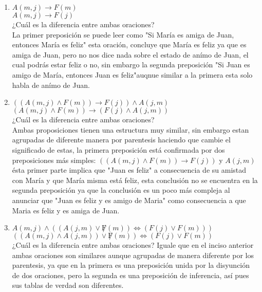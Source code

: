 \documentclass[a4paper,10pt]{article}
\begin{document}
\begin{enumerate}[label=(\alph*)]
 \item \(A(m,j) \to F(m)\)\\
       \(A(m,j) \to F(j)\)\\
       ¿Cuál es la diferencia entre ambas oraciones?\\
       La primer preposición se puede leer como "Si María es amiga de Juan, entonces María es feliz" esta oración, concluye que María es feliz ya que es amiga de Juan, pero no nos dice nada sobre el estado de anímo de Juan, el cual podrás estar feliz o no, sin embargo la segunda preposición "Si Juan es amigo de María, entonces Juan es feliz"auqnue similar a la primera esta solo habla de anímo de Juan.
\item \(((A(m,j) \land F(m)) \to F(j)) \land A(j,m)\)\\
      \((A(m,j) \land F(m)) \to (F(j) \land A(j,m))\)\\
      ¿Cuál es la diferencia entre ambas oraciones?\\
      Ambas proposiciones tienen una estructura muy similar, sin embargo estan agrupadas de diferente manera por parentesis haciendo que cambie el significado de estas, la primera preposición está confirmada por dos preposiciones más simples: \(((A(m,j) \land F(m)) \to F(j))\) y \(A(j,m)\) ésta primer parte implica que "Juan es feliz" a consecuencia de su amistad con María y que María misma está feliz, esta conclusión no se encuentra en la segunda preposición ya que la conclusión es un poco más compleja al anunciar que "Juan es feliz y es amigo de Maria" como consecuencia a que Maria es feliz y es amiga de Juan.
\item \(A(m,j) \land ((A(j,m) \lor \not F(m)) \iff (F(j) \lor F(m)))\)\\
      \(((A(m,j) \land A(j,m)) \lor \not F(m)) \iff (F(j) \lor F(m))\)\\
      ¿Cuál es la diferencia entre ambas oraciones?
      Iguale que en el inciso anterior ambas oraciones son similares aunque agrupadas de manera diferente por los parentesis, ya que en la primera es una preposición unida por la disyunción de dos oraciones, pero la segunda es una preposición de inferencia, así pues sus tablas de verdad son diferentes.
\end{enumerate}
\end{document}
